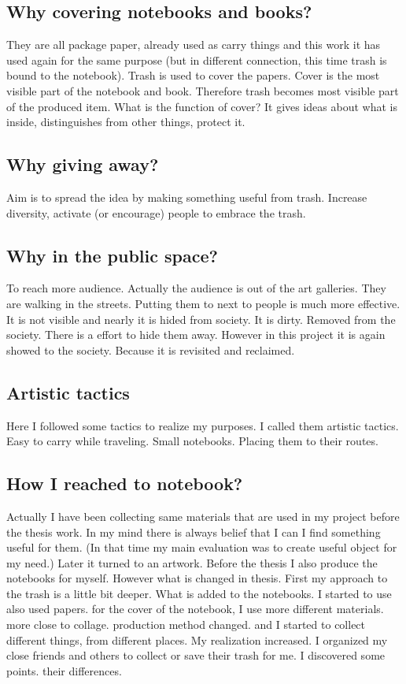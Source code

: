 \subsection{Why covering notebooks and books?}
They are all package paper, already used as carry things and this work it has used again for the same purpose (but in different connection, this time trash is bound to the notebook). Trash is used to cover the papers. Cover is the most visible part of the notebook and book. Therefore trash becomes most visible part of the produced item. What is the function of cover? It gives ideas about what is inside, distinguishes from other things, protect it.

\subsection{Why giving away?}
Aim is to spread the idea by making something useful from trash. Increase diversity, activate (or encourage) people to embrace the trash.

\subsection{Why in the public space?}
To reach more audience. Actually the audience is out of the art galleries. They are walking in the streets. Putting them to next to people is much more effective. It is not visible and nearly it is hided from society. It is dirty. Removed from the society. There is a effort to hide them away. However in this project it is again showed to the society. Because it is revisited and reclaimed. 


\subsection{Artistic tactics}
Here I followed some tactics to realize my purposes. I called them artistic tactics. Easy to carry while traveling. Small notebooks. Placing them to their routes. 

\subsection{How I reached to notebook?}
Actually I have been collecting same materials that are used in my project before the thesis work. In my mind there is always belief that I can I find something useful for them. (In that time my main evaluation was to create useful object for my need.) Later it turned to an artwork. Before the thesis I also produce the notebooks for myself. However what is changed in thesis. First my approach to the trash is a little bit deeper. What is added to the notebooks. I started to use also used papers. for the cover of the notebook, I use more different materials. more close to collage. production method changed. and I started to collect different things, from different places. My realization increased. I organized my close friends and others to collect or save their trash for me. I discovered some points. their differences. 

